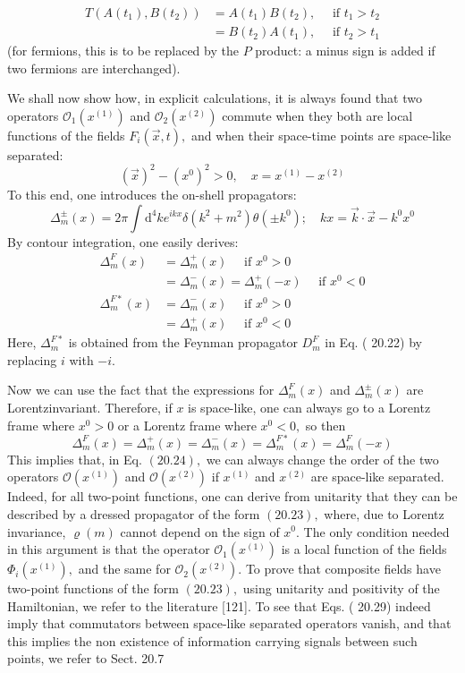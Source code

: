 \documentclass[main.tex]{subfiles}
\begin{document}
$$
\begin{aligned}
T\left(A\left(t_{1}\right), B\left(t_{2}\right)\right) &=A\left(t_{1}\right) B\left(t_{2}\right), \quad \text { if } t_{1}>t_{2} \\
&=B\left(t_{2}\right) A\left(t_{1}\right), \quad \text { if } t_{2}>t_{1}
\end{aligned}
$$
(for fermions, this is to be replaced by the $P$ product: a minus sign is added if two fermions are interchanged).

We shall now show how, in explicit calculations, it is always found that two operators $\mathcal{O}_{1}\left(x^{(1)}\right)$ and $\mathcal{O}_{2}\left(x^{(2)}\right)$ commute when they both are local functions of the fields $F_{i}(\vec{x}, t),$ and when their space-time points are space-like separated:
$$
(\vec{x})^{2}-\left(x^{0}\right)^{2}>0, \quad x=x^{(1)}-x^{(2)}
$$
To this end, one introduces the on-shell propagators:
$$
\Delta_{m}^{\pm}(x)=2 \pi \int \mathrm{d}^{4} k e^{i k x} \delta\left(k^{2}+m^{2}\right) \theta\left(\pm k^{0}\right) ; \quad k x=\vec{k} \cdot \vec{x}-k^{0} x^{0}
$$
By contour integration, one easily derives:
$$
\begin{aligned}
\Delta_{m}^{F}(x) &=\Delta_{m}^{+}(x) \quad \text { if } x^{0}>0 \\
&=\Delta_{m}^{-}(x)=\Delta_{m}^{+}(-x) \quad \text { if } x^{0}<0 \\
\Delta_{m}^{F *}(x) &=\Delta_{m}^{-}(x) \quad \text { if } x^{0}>0 \\
&=\Delta_{m}^{+}(x) \quad \text { if } x^{0}<0
\end{aligned}
$$
Here, $\Delta_{m}^{F *}$ is obtained from the Feynman propagator $D_{m}^{F}$ in Eq. ( 20.22) by replacing $i$ with $-i$.

Now we can use the fact that the expressions for $\Delta_{m}^{F}(x)$ and $\Delta_{m}^{\pm}(x)$ are Lorentzinvariant. Therefore, if $x$ is space-like, one can always go to a Lorentz frame where $x^{0}>0$ or a Lorentz frame where $x^{0}<0,$ so then
$$
\Delta_{m}^{F}(x)=\Delta_{m}^{+}(x)=\Delta_{m}^{-}(x)=\Delta_{m}^{F *}(x)=\Delta_{m}^{F}(-x)
$$
This implies that, in Eq. $(20.24),$ we can always change the order of the two operators $\mathcal{O}\left(x^{(1)}\right)$ and $\mathcal{O}\left(x^{(2)}\right)$ if $x^{(1)}$ and $x^{(2)}$ are space-like separated. Indeed, for all two-point functions, one can derive from unitarity that they can be described by a dressed propagator of the form $(20.23),$ where, due to Lorentz invariance, $\varrho(m)$ cannot depend on the sign of $x^{0} .$ The only condition needed in this argument is that the operator $\mathcal{O}_{1}\left(x^{(1)}\right)$ is a local function of the fields $\Phi_{i}\left(x^{(1)}\right),$ and the same
for $\mathcal{O}_{2}\left(x^{(2)}\right) .$ To prove that composite fields have two-point functions of the form $(20.23),$ using unitarity and positivity of the Hamiltonian, we refer to the literature [121]. To see that Eqs. ( 20.29) indeed imply that commutators between space-like separated operators vanish, and that this implies the non existence of information carrying signals between such points, we refer to Sect. 20.7
\end{document}

